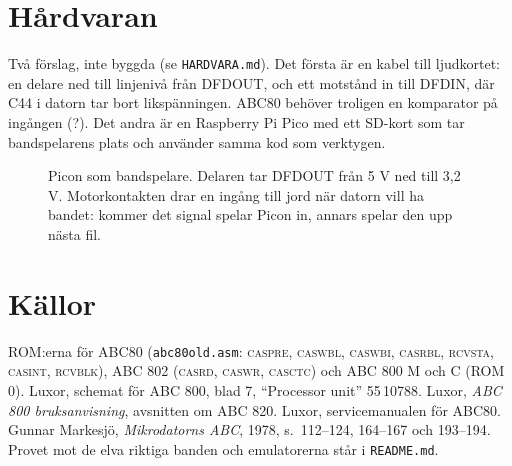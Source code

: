\documentclass[10pt]{article}
\newcommand\kw[1]{\texttt{#1}}
\newcommand\namn[1]{\textsc{\MakeLowercase{#1}}}
\begin{document}
\section{Hårdvaran}

Två förslag, inte byggda (se \kw{HARDVARA.md}). Det första är en kabel
till ljudkortet: en delare ned till linjenivå från DFDOUT, och ett motstånd
in till DFDIN, där C44 i datorn tar bort likspänningen. ABC80 behöver
troligen en komparator på ingången (?). Det andra är en Raspberry Pi Pico
med ett SD-kort som tar bandspelarens plats och använder samma kod som
verktygen.

\begin{figure}[H]
\centering
{}
\caption{Picon som bandspelare. Delaren tar DFDOUT från 5 V ned till 3,2 V.
Motorkontakten drar en ingång till jord när datorn vill ha bandet: kommer
det signal spelar Picon in, annars spelar den upp nästa fil.}
\end{figure}

\section*{Källor}

\small
ROM:erna för ABC80 (\kw{abc80old.asm}: \namn{CASPRE}, \namn{CASWBL},
\namn{CASWBI}, \namn{CASRBL}, \namn{RCVSTA}, \namn{CASINT}, \namn{RCVBLK}),
ABC 802 (\namn{CASRD}, \namn{CASWR}, \namn{CASCTC}) och ABC 800 M och C
(ROM 0). Luxor, schemat för ABC 800, blad 7, ``Processor unit'' 55\,10788.
Luxor, \emph{ABC 800 bruksanvisning}, avsnitten om ABC 820. Luxor,
servicemanualen för ABC80. Gunnar Markesjö, \emph{Mikrodatorns ABC}, 1978,
s.~112--124, 164--167 och 193--194. Provet mot de elva riktiga banden och
emulatorerna står i \kw{README.md}.
\end{document}
